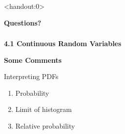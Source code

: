 \begin{frame}<handout:0>
  \begin{center}
    \Huge{\textbf{Questions?}}
  \end{center}
\end{frame}

\begin{frame}
  \frametitle{}

  \begin{center}
    \Large{\textbf{4.1 Continuous Random Variables}}

    \bigskip

    \large{\textbf{Some Comments}}
  \end{center}


\end{frame}




\begin{frame}
  \begin{block}{Interpreting PDFs}
    \begin{enumerate}
    \item<1,2|handout:1-> Probability
      
    \item<1,3|handout:1-> Limit of histogram
    \item<1|handout:1-> Relative probability
    \end{enumerate}
  \end{block}
\end{frame}

